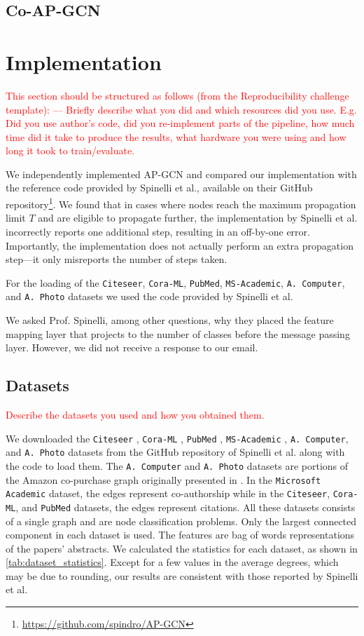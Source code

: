 \documentclass{gdl}
\begin{document}
\subsection{Co-AP-GCN}

\section{Implementation}

\textcolor{red}{
This section should be structured as follows (from the Reproducibility challenge template):
---
Briefly describe what you did and which resources did you use. E.g. Did you use author's code, did you re-implement parts of the pipeline, how much time did it take to produce the results, what hardware you were using and how long it took to train/evaluate. }

We independently implemented AP-GCN and compared our implementation with the reference code provided by Spinelli et al., available on their GitHub repository\footnote{\url{https://github.com/spindro/AP-GCN}}. We found that in cases where nodes reach the maximum propagation limit $T$ and are eligible to propagate further, the implementation by Spinelli et al. incorrectly reports one additional step, resulting in an off-by-one error. Importantly, the implementation does not actually perform an extra propagation step—it only misreports the number of steps taken.

For the loading of the \texttt{Citeseer}, \texttt{Cora-ML}, \texttt{PubMed}, \texttt{MS-Academic}, \texttt{A. Computer}, and \texttt{A. Photo} datasets we used the code provided by Spinelli et al.

We asked Prof. Spinelli, among other questions, why they placed the feature mapping layer that projects to the number of classes before the message passing layer. However, we did not receive a response to our email.

\subsection{Datasets}
\textcolor{red}{Describe the datasets you used and how you obtained them. }

We downloaded the \texttt{Citeseer} \cite{sen2008}, \texttt{Cora-ML} \cite{mccallum2000}, \texttt{PubMed} \cite{namata2012}, \texttt{MS-Academic} \cite{shchur2018}, \texttt{A. Computer}, and \texttt{A. Photo} datasets from the GitHub repository of Spinelli et al. along with the code to load them. The \texttt{A. Computer} and \texttt{A. Photo} datasets are portions of the Amazon co-purchase graph originally presented in \cite{mcauley2015}. In the \texttt{Microsoft Academic} dataset, the edges represent co-authorship while in the \texttt{Citeseer}, \texttt{Cora-ML}, and \texttt{PubMed} datasets, the edges represent citations. All these datasets consists of a single graph and are node classification problems. Only the largest connected component in each dataset is used. The features are bag of words representations of the papers' abstracts. We calculated the statistics for each dataset, as shown in \autoref{tab:dataset_statistics}. Except for a few values in the average degrees, which may be due to rounding, our results are consistent with those reported by Spinelli et al.
\end{document}
